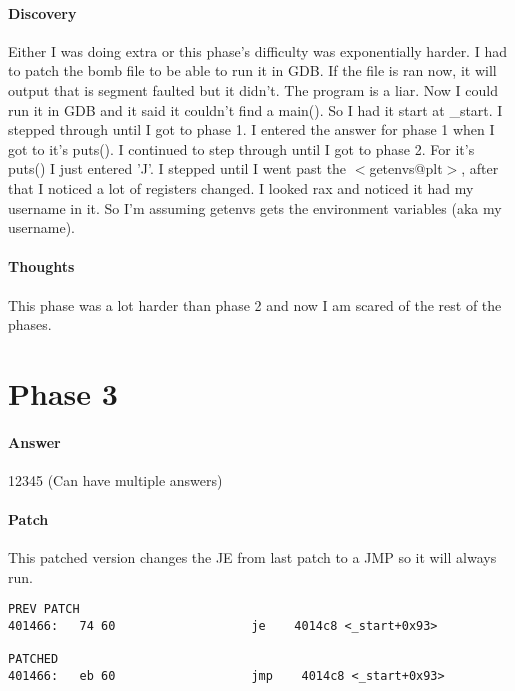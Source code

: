 \documentclass[12pt]{article}
\begin{document}
\paragraph{Discovery}
Either I was doing extra or this phase's difficulty was exponentially harder. I had to patch the bomb file to be able to run it in GDB. If the file is ran now, it will output that is segment faulted but it didn't. The program is a liar. Now I could run it in GDB and it said it couldn't find a main(). So I had it start at \_start. I stepped through until I got to phase 1. I entered the answer for phase 1 when I got to it's puts(). I continued to step through until I got to phase 2. For it's puts() I just entered 'J'. I stepped until I went past the $<$getenvs@plt$>$, after that I noticed a lot of registers changed. I looked rax and noticed it had my username in it. So I'm assuming getenvs gets the environment variables (aka my username).

\paragraph{Thoughts}
This phase was a lot harder than phase 2 and now I am scared of the rest of the phases.

\section{Phase 3}
\paragraph{Answer}
12345 (Can have multiple answers)

\paragraph{Patch}
This patched version changes the JE from last patch to a JMP so it will always run.

\begin{verbatim}
PREV PATCH
401466:   74 60                   je    4014c8 <_start+0x93>

PATCHED
401466:   eb 60                   jmp    4014c8 <_start+0x93>
\end{verbatim}
\end{document}
